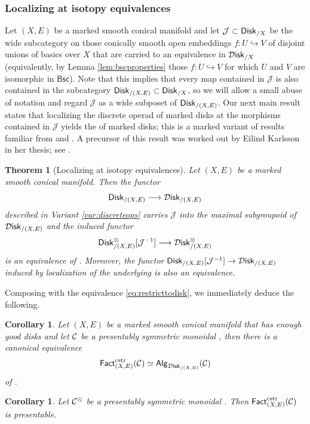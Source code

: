 \documentclass[10pt, reqno, twoside
, final
]{amsart}
\numberwithin{equation}{subsection}%
\theoremstyle{definition}
\theoremstyle{definition}
\theoremstyle{definition}
\theoremstyle{definition}
\theoremstyle{definition}
\theoremstyle{definition}
\theoremstyle{definition}
\theoremstyle{definition}
\theoremstyle{definition}
\theoremstyle{plain}
\newtheorem{thm}[defn]{Theorem}
\theoremstyle{definition}
\theoremstyle{plain}
\theoremstyle{definition}
\theoremstyle{plain}
\newtheorem{cor}[defn]{Corollary}
\theoremstyle{definition}
\theoremstyle{definition}
\theoremstyle{plain}
\theoremstyle{plain}
\theoremstyle{definition}
\theoremstyle{plain}
\theoremstyle{plain}
\theoremstyle{plain}
\begin{document}
\subsubsection{Localizing at isotopy equivalences}

Let $(X,E)$ be a marked smooth conical manifold and let $\mathcal{J}\subset \mathsf{Disk}_{/X}$ be the wide subcategory on those conically smooth open embeddings $f:U\hookrightarrow V$ of disjoint unions of basics over $X$ that are carried to an equivalence in $\mathcal{D}\mathsf{isk}_{/X}$ (equivalently, by Lemma \ref{lem:bscproperties} those $f:U\hookrightarrow V$ for which $U$ and $V$ are isomorphic in $\mathsf{Bsc}$). Note that this implies that every map contained in $\mathcal{J}$ is also contained in the subcategory $\mathsf{Disk}_{/(X,E)}\subset \mathsf{Disk}_{/X}$, so we will allow a small abuse of notation and regard $\mathcal{J}$ as a wide subposet of $\mathsf{Disk}_{/(X,E)}$. Our next main result states that localizing the discrete operad of marked disks at the morphisms contained in $\mathcal{J}$ yields the \infop of marked disks; this is a marked variant of results familiar from \cite[Section 5.4.5]{LurHA} and \cite{AFT-fh-stratified}. A precursor of this result was worked out by Eilind Karlsson in her thesis; see \cite[Theorem 7.25]{KS}. 
\begin{thm}[Localizing at isotopy equivalences]\label{thm:markedlocalization}
Let $(X,E)$ be a marked smooth conical manifold. Then the functor 
\[ \mathsf{Disk}_{/(X,E)} \longrightarrow \mathcal{D}\mathsf{isk}_{/(X,E)} \]
described in Variant \ref{var:discreteops} carries $\mathcal{J}$ into the maximal subgroupoid of $\mathcal{D}\mathsf{isk}_{/(X,E)}$ and the induced functor
\[  \mathsf{Disk}_{/(X,E)}^{\otimes}[\mathcal{J}^{-1}] \longrightarrow  \mathcal{D}\mathsf{isk}^{\otimes}_{/(X,E)}  \]
is an equivalence of \infopst. Moreover, the functor $\mathsf{Disk}_{/(X,E)}[\mathcal{J}^{-1}]\rightarrow \mathcal{D}\mathsf{isk}_{/(X,E)}$ induced by localization of the underlying \infcats is also an equivalence.
\end{thm}
Composing with the equivalence \eqref{eq:restricttodisk}, we immediately deduce the following.
\begin{cor}\label{cor:fact=alg}
Let $(X,E)$ be a marked smooth conical manifold that has enough good disks and let $\mathcal{C}$ be a presentably symmetric monoidal \infcatt, then there is a canonical equivalence 
\[  \mathsf{Fact}^{\mathrm{cstr}}_{(X,E)}(\mathcal{C})\simeq \mathsf{Alg}_{\mathcal{D}\mathsf{isk}_{/(X,E)}}(\mathcal{C}) \]
of \infcatst.
\end{cor}
\begin{cor}
Let $\mathcal{C}^{\otimes}$ be a presentably symmetric monoidal \infcatt. Then $ \mathsf{Fact}^{\mathrm{cstr}}_{(X,E)}(\mathcal{C})$ is presentable.    
\end{cor}
\end{document}
